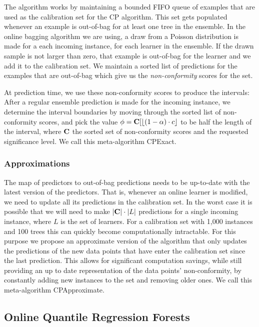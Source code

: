 The algorithm works by maintaining a bounded FIFO queue of examples
that are used as the calibration set for the CP algorithm. This set
gets populated whenever an example is out-of-bag for at least one
tree in the ensemble. In the online bagging algorithm we are using,
a draw from a Poisson distribution is made for a each incoming instance,
for each learner in the ensemble. If the drawn sample is not larger
than zero, that example is out-of-bag for the learner and we add it
to the calibration set. We maintain a sorted list of predictions for the
examples that are out-of-bag which give us the \emph{non-conformity}
scores for the set.

At prediction time, we use these non-conformity scores to produce the
intervals: After a regular ensemble prediction is made for the incoming
instance, we determine the interval boundaries by moving through the
sorted list of non-conformity scores, and pick the value
$\phi = \calSet[\floor*{(1 - \significance) \cdot c}$ to be half the
length of the interval, where $\calSet$ the sorted set of non-conformity scores
and \significance the requested significance level.
We call this meta-algorithm CPExact.

\subsubsection*{Approximations}

The map of predictors to out-of-bag predictions needs to be up-to-date with
the latest version of the predictors. That is, whenever an online learner
is modified, we need to update all its predictions in the calibration set.
In the worst case it is possible that we will need to make $|\calSet| \cdot |L|$
predictions for a single incoming instance, where $L$ is the set of learners.
For a calibration set with 1,000 instances and 100 trees this can quickly
become computationally intractable. For this purpose we propose an approximate
version of the algorithm that only updates the predictions of the new
data points that have enter the calibration set since the last prediction.
This allows for significant computation savings, while still providing
an up to date representation of the data points' non-conformity, by constantly
adding new instances to the set and removing older ones. We call this
meta-algorithm CPApproximate.

\subsection{Online Quantile Regression Forests}

